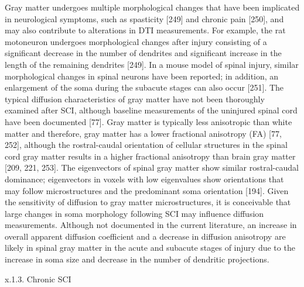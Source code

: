 Gray matter undergoes multiple morphological changes that have been implicated in neurological symptoms, such as spasticity [249] and chronic pain [250], and may also contribute to alterations in DTI measurements.  For example, the rat motoneuron undergoes morphological changes after injury consisting of a significant decrease in the number of dendrites and significant increase in the length of the remaining dendrites [249].  In a mouse model of spinal injury, similar morphological changes in spinal neurons have been reported; in addition, an enlargement of the soma during the subacute stages can also occur [251].  The typical diffusion characteristics of gray matter have not been thoroughly examined after SCI, although baseline measurements of the uninjured spinal cord have been documented [77]. Gray matter is typically less anisotropic than white matter and therefore, gray matter has a lower fractional anisotropy (FA) [77, 252], although the rostral-caudal orientation of cellular structures in the spinal cord gray matter results in a higher fractional anisotropy than brain gray matter [209, 221, 253].  The eigenvectors of spinal gray matter show similar rostral-caudal dominance; eigenvectors in voxels with low eigenvalues show orientations that may follow microstructures and the predominant soma orientation [194].  Given the sensitivity of diffusion to gray matter microstructures, it is conceivable that large changes in soma morphology following SCI may influence diffusion measurements.  Although not documented in the current literature, an increase in overall apparent diffusion coefficient and a decrease in diffusion anisotropy are likely in spinal gray matter in the acute and subacute stages of injury due to the increase in soma size and decrease in the number of dendritic projections. 

x.1.3. Chronic SCI

